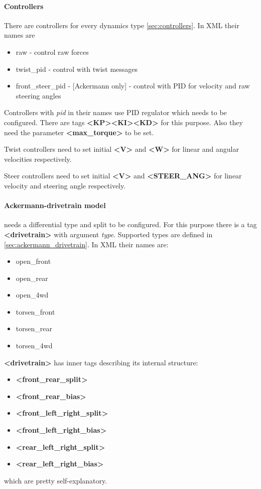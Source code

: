 \documentclass[a4paper,11pt]{article}
\begin{document}
\paragraph{Controllers} 
There are controllers for every dynamics type \ref{sec:controllers}.
In XML their names are 
\begin{itemize}
	\item raw - control raw forces
	\item twist\_pid - control with twist messages
	\item front\_steer\_pid - [Ackermann only] - control with PID for velocity and raw steering angles
\end{itemize}

Controllers with \textit{pid} in their names use PID regulator which needs to be configured.
There are tags \textbf{\textless KP\textgreater}\textbf{\textless KI\textgreater}\textbf{\textless KD\textgreater} for this purpose. Also they need the parameter \textbf{\textless max\_torque\textgreater} to be set.

Twist controllers need to set initial \textbf{\textless V\textgreater} and \textbf{\textless W\textgreater} for linear and angular velocities respectively.

Steer controllers need to set initial \textbf{\textless V\textgreater} and \textbf{\textless STEER\_ANG\textgreater} for linear velocity and steering angle respectively.

\paragraph{Ackermann-drivetrain model} needs a differential type and split to be configured. For this purpose there is a tag \textbf{\textless drivetrain\textgreater} with argument \textit{type}.
Supported types are defined in \ref{sec:ackermann_drivetrain}. In XML their names are:
\begin{itemize}
	\item open\_front
	\item open\_rear
	\item open\_4wd
	\item torsen\_front
	\item torsen\_rear
	\item torsen\_4wd
\end{itemize}

\textbf{\textless drivetrain\textgreater} has inner tags describing its internal structure:
\begin{itemize}
	\item \textbf{\textless front\_rear\_split\textgreater}
	\item \textbf{\textless front\_rear\_bias\textgreater}
	\item \textbf{\textless front\_left\_right\_split\textgreater}
	\item \textbf{\textless front\_left\_right\_bias\textgreater}
	\item \textbf{\textless rear\_left\_right\_split\textgreater}
	\item \textbf{\textless rear\_left\_right\_bias\textgreater}
\end{itemize}
which are pretty self-explanatory.
\end{document}
